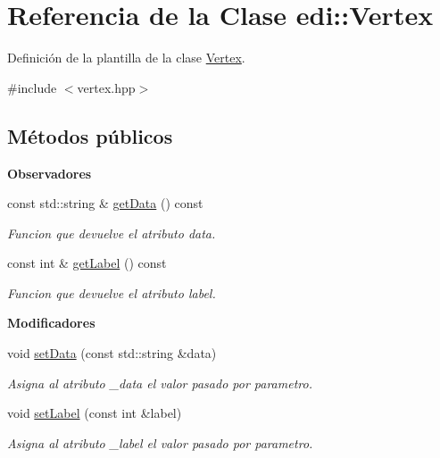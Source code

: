 \hypertarget{classedi_1_1Vertex}{}\section{Referencia de la Clase edi\+:\+:Vertex}
\label{classedi_1_1Vertex}


Definición de la plantilla de la clase \hyperlink{classedi_1_1Vertex}{Vertex}.  




{\ttfamily \#include $<$vertex.\+hpp$>$}

\subsection*{Métodos públicos}
\begin{Indent}{\bf Observadores}\par
\begin{DoxyCompactItemize}
\item 
const std\+::string \& \hyperlink{classedi_1_1Vertex_a8e0d6006de80939c6096ae75dcec8492}{get\+Data} () const 
\begin{DoxyCompactList}\small\item\em Funcion que devuelve el atributo data. \end{DoxyCompactList}\item 
const int \& \hyperlink{classedi_1_1Vertex_ae12f1285a09f2dbb14554f9a7bc3f5b6}{get\+Label} () const 
\begin{DoxyCompactList}\small\item\em Funcion que devuelve el atributo label. \end{DoxyCompactList}\end{DoxyCompactItemize}
\end{Indent}
\begin{Indent}{\bf Modificadores}\par
\begin{DoxyCompactItemize}
\item 
void \hyperlink{classedi_1_1Vertex_ac54513ccf42164308239c493e7ef84d1}{set\+Data} (const std\+::string \&data)
\begin{DoxyCompactList}\small\item\em Asigna al atributo \+\_\+data el valor pasado por parametro. \end{DoxyCompactList}\item 
void \hyperlink{classedi_1_1Vertex_af87a2711c62dce91a06bc5d475cd250a}{set\+Label} (const int \&label)
\begin{DoxyCompactList}\small\item\em Asigna al atributo \+\_\+label el valor pasado por parametro. \end{DoxyCompactList}\end{DoxyCompactItemize}
\end{Indent}
